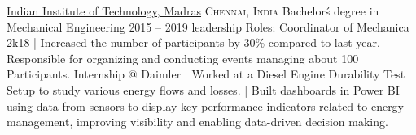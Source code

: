 \documentclass[10pt,a4paper]{article}
\begin{document}
\headedsection
{\href{https://www.iitm.ac.in/}{Indian Institute of Technology, Madras}}
{\textsc{Chennai, India}} {%
	\headedsubsection
	{Bachelor\'s degree in Mechanical Engineering}
	{2015 -- 2019}
	{}
	\headedsubsection
	{leadership Roles:}{}{
		\newline Coordinator of Mechanica 2k18
		\newline | Increased the number of participants by 30\% compared to last year. Responsible for organizing and conducting events managing about 100 Participants.
	}
	\headedsubsection
	{Internship @ Daimler}{}{
		\newline | Worked at a Diesel Engine Durability Test Setup to study various energy flows and losses.
		\newline | Built dashboards in Power BI using data from sensors to display key performance indicators related to energy management, improving visibility and enabling data-driven decision making.
	}
}

\spacedhrule{0.5em}{-0.4em}







\end{document}

